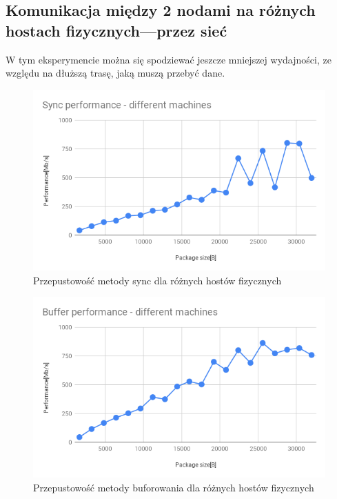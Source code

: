 \documentclass[11pt]{article}
\begin{document}
    \subsection{Komunikacja między 2 nodami na różnych hostach fizycznych---przez sieć}

    W tym eksperymencie można się spodziewać jeszcze mniejszej wydajności, ze względu na dłuższą trasę, jaką muszą przebyć
    dane.

    \begin{figure}[H]
        \includegraphics[width=1\textwidth,frame]{charts/Sync performance - different machines.png}
        \caption{Przepustowość metody sync dla różnych hostów fizycznych}
        \label{fig:sync-diff-performance}
    \end{figure}

    \begin{figure}[H]
        \includegraphics[width=1\textwidth,frame]{charts/Buffer performance - different machines.png}
        \caption{Przepustowość metody buforowania dla różnych hostów fizycznych}
        \label{fig:buff-diff-performance}
    \end{figure}
\end{document}
